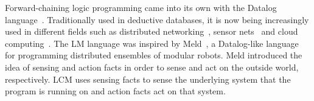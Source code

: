 Forward-chaining logic programming came into its own with the Datalog
language~\cite{Ullman:1990:PDK:533142}.  Traditionally used in deductive
databases, it is now being increasingly used in different fields such as
distributed networking~\cite{Loo-condie-garofalakis-p2}, sensor
nets~\cite{Chu:2007:DID:1322263.1322281} and cloud computing~\cite{alvaro:boom}.
The LM language was inspired by Meld~\cite{ashley-rollman-iclp09}, a
Datalog-like language for programming distributed ensembles of modular robots.
Meld introduced the idea of sensing and action facts in order to sense and act
on the outside world, respectively. LCM uses sensing facts to sense the
underlying system that the program is running on and action facts act on that
system.
